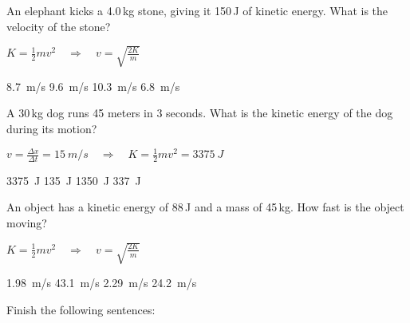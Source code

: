 \documentclass[]{exam}
\begin{document}
\begin{questions}
\question %
An elephant kicks a 4.0\,kg stone, giving it 150\,J of kinetic energy. What is the velocity of the stone? 

\ifprintanswers
{\color{red}
$K = \frac{1}{2} m v^2 \quad \Rightarrow \quad v = \sqrt{\frac{2K}{m}}$
}
\fi

\begin{randomizechoices}
    \correctchoice \SI{8.7}{m/s}
    \choice \SI{9.6}{m/s}
    \choice \SI{10.3}{m/s}
    \choice \SI{6.8}{m/s}
\end{randomizechoices}


\question %
A 30\,kg dog runs 45 meters in 3 seconds. What is the kinetic energy of the dog during its motion?

\ifprintanswers
{\color{red}  $v = \frac{\Delta x}{\Delta t} = \SI{15}{m/s} \quad \Rightarrow \quad K = \frac{1}{2}mv^2 = \SI{3375}{J}$}
\fi

\begin{randomizechoices}
    \correctchoice \SI{3375}{J}
    \choice \SI{135}{J}
    \choice \SI{1350}{J}
    \choice \SI{337}{J}
\end{randomizechoices}


\question %
An object has a kinetic energy of 88\,J and a mass of 45\,kg. How fast is the object moving?

\ifprintanswers
{\color{red}
$K = \frac{1}{2} m v^2 \quad \Rightarrow \quad v = \sqrt{\frac{2K}{m}}$
}
\fi

\begin{randomizechoices}
    \correctchoice \SI{1.98}{m/s}
    \choice \SI{43.1}{m/s}
    \choice \SI{2.29}{m/s}
    \choice \SI{24.2}{m/s}
\end{randomizechoices}



\question 
Finish the following sentences:

 

\end{questions}
\end{document}

